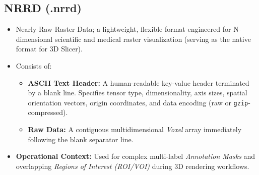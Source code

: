 \documentclass[11pt, a4paper]{article}
\begin{document}
\subsection{NRRD (.nrrd)}
\begin{itemize}
    \item Nearly Raw Raster Data; a lightweight, flexible format engineered for N-dimensional scientific and medical raster visualization (serving as the native format for 3D Slicer).
    \item Consists of:
    \begin{itemize}
        \item \textbf{ASCII Text Header:} A human-readable key-value header terminated by a blank line. Specifies tensor type, dimensionality, axis sizes, spatial orientation vectors, origin coordinates, and data encoding (raw or \texttt{gzip}-compressed).
        \item \textbf{Raw Data:} A contiguous multidimensional \textit{Voxel} array immediately following the blank separator line.
    \end{itemize}
    \item \textbf{Operational Context:} Used for complex multi-label \textit{Annotation Masks} and overlapping \textit{Regions of Interest (ROI/VOI)} during 3D rendering workflows.
\end{itemize}
\end{document}
